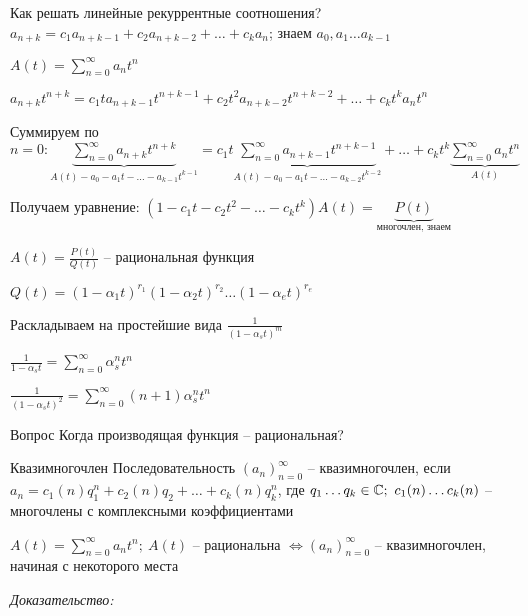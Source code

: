 \documentclass[12pt]{article}
\begin{document}
\begin{nota}{Как решать линейные рекуррентные соотношения?}
    $a_{n + k} = c_1a_{n + k - 1} + c_2a_{n + k - 2} + \ldots + c_ka_n$; знаем $a_0, a_1 \ldots a_{k - 1}$

    $A(t) = \sum\limits_{n = 0}^\infty a_nt^n$

    $a_{n + k}t^{n + k} = c_1ta_{n + k - 1}t^{n + k - 1} + c_2t^2a_{n + k - 2}t^{n + k - 2} + \ldots + c_kt^ka_nt^n$

    Суммируем по $n = 0 : \underbrace{\sum\limits_{n = 0}^\infty a_{n + k}t^{n + k}}_{A(t) - a_0 - a_1t - \ldots - a_{k - 1}t^{k - 1}} = c_1t\underbrace{\sum\limits_{n = 0}^\infty a_{n + k - 1}t^{n + k - 1}}_{A(t) - a_0 - a_1t - \ldots - a_{k - 2}t^{k - 2}} + \ldots + c_kt^k\underbrace{\sum\limits_{n = 0}^\infty a_nt^n}_{A(t)}$

    Получаем уравнение: $(1 - c_1t - c_2t^2 - \ldots - c_kt^k)A(t) = \underbrace{P(t)}_\text{многочлен, знаем}$

    $A(t) = \frac{P(t)}{Q(t)}$ -- рациональная функция 

    $Q(t) = (1 - \alpha_1t)^{r_1} (1 - \alpha_2t)^{r_2} \ldots (1 - \alpha_et)^{r_e}$

    Раскладываем на простейшие вида $\frac{1}{(1 - \alpha_s t)^{m}}$

    $\frac{1}{1 - \alpha_s t} = \sum\limits_{n = 0}^\infty \alpha_s^nt^n$

    $\frac{1}{(1 - \alpha_st)^2} = \sum\limits_{n = 0}^\infty (n + 1)\alpha_s^nt^n$
\end{nota}

\begin{Remark}{Вопрос}
    Когда производящая функция -- рациональная?
\end{Remark}

\begin{defin}{Квазимногочлен}
    Последовательность $(a_n)_{n = 0}^\infty$ -- квазимногочлен, если $a_n = c_1(n)q_1^n + c_2(n)q_2 + \ldots + c_k(n)q_k^n$, где $q_1 \ldots q_k \in \mathbb C;\ c_1(n) \ldots c_k(n)$ -- многочлены с комплексными коэффициентами 
\end{defin}

\begin{theo}{}
    $A(t) = \sum\limits_{n = 0}^\infty a_nt^n;\ A(t)$ -- рациональна $\Leftrightarrow (a_n)_{n = 0}^\infty$ -- квазимногочлен, начиная с некоторого места
\end{theo}

\textit{Доказательство:}
\end{document}
